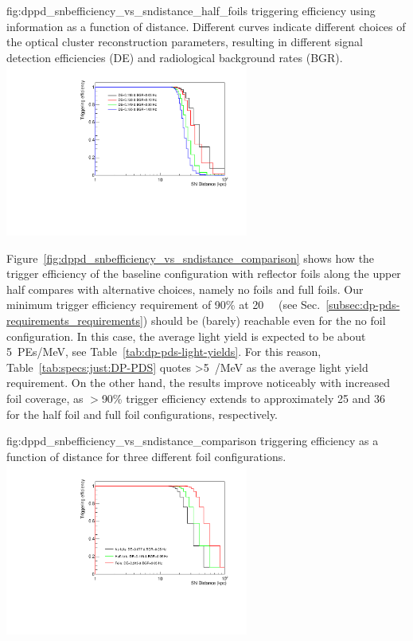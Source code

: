 \begin{dunefigure}{fig:dppd_snbefficiency_vs_sndistance_half_foils}
     { triggering efficiency using   information as a function of  distance. Different curves indicate different choices of the optical cluster reconstruction parameters, resulting in different  \nue signal detection efficiencies (DE) and radiological background rates (BGR).}
    \includegraphics[width=0.6\textwidth]{graphics/dppd_snbefficiency_vs_sndistance_half_foils.pdf}
    \end{dunefigure}

Figure~\ref{fig:dppd_snbefficiency_vs_sndistance_comparison} shows how the  trigger efficiency of the baseline configuration with  reflector foils along the upper  half compares with alternative choices, namely no foils and full foils. Our minimum  trigger efficiency requirement of \num{90}\% at \SI{20}{\kilo\parsec} (see Sec.~\ref{subsec:dp-pds-requirements_requirements}) should be (barely) reachable even for the no foil configuration. In this case, the average light yield is expected to be about \SI{5}{PEs/MeV}, see Table~\ref{tab:dp-pds-light-yields}. For this reason, Table~\ref{tab:specs:just:DP-PDS} quotes \SI{>5}{/\MeV} as the average light yield requirement. On the other hand, the results improve noticeably with increased foil coverage, as $>$\num{90}\% trigger efficiency extends to approximately \num{25} and \SI{36}{\kilo\parsec} for the half foil and full foil configurations, respectively. 

\begin{dunefigure}{fig:dppd_snbefficiency_vs_sndistance_comparison}
     { triggering efficiency as a function of  distance for three different  foil configurations.}
    \includegraphics[width=0.6\textwidth]{graphics/dppd_snbefficiency_vs_sndistance_comparison.pdf}
    \end{dunefigure}

